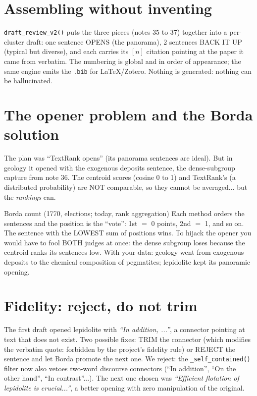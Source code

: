 \documentclass[11pt,a4paper]{article}
\begin{document}

\section{Assembling without inventing}

\texttt{draft\_review\_v2()} puts the three pieces (notes 35 to 37) together into a per-cluster
draft: one sentence OPENS (the panorama), 2 sentences BACK IT UP (typical but diverse), and
each carries its $[n]$ citation pointing at the paper it came from verbatim. The numbering is
global and in order of appearance; the same engine emits the \texttt{.bib} for LaTeX/Zotero.
Nothing is generated: nothing can be hallucinated.

\section{The opener problem and the Borda solution}

The plan was ``TextRank opens'' (its panorama sentences are ideal). But in geology it opened
with the exogenous deposits sentence, the dense-subgroup capture from note 36. The centroid
scores (cosine 0 to 1) and TextRank's (a distributed probability) are NOT comparable, so they
cannot be averaged... but the \emph{rankings} can.

\begin{concepto}{Borda count (1770, elections; today, rank aggregation)}
Each method orders the sentences and the position is the ``vote'': 1st $=$ 0 points, 2nd $=$ 1,
and so on. The sentence with the LOWEST sum of positions wins. To hijack the opener you would
have to fool BOTH judges at once: the dense subgroup loses because the centroid ranks its
sentences low. With your data: geology went from exogenous deposits to the chemical composition
of pegmatites; lepidolite kept its panoramic opening.
\end{concepto}

\section{Fidelity: reject, do not trim}

The first draft opened lepidolite with \emph{``In addition, ...''}, a connector pointing at text
that does not exist. Two possible fixes: TRIM the connector (which modifies the verbatim quote:
forbidden by the project's fidelity rule) or REJECT the sentence and let Borda promote the next
one. We reject: the \texttt{\_self\_contained()} filter now also vetoes two-word discourse
connectors (``In addition'', ``On the other hand'', ``In contrast''...). The next one chosen was
\emph{``Efficient flotation of lepidolite is crucial...''}, a better opening with zero
manipulation of the original.
\end{document}
